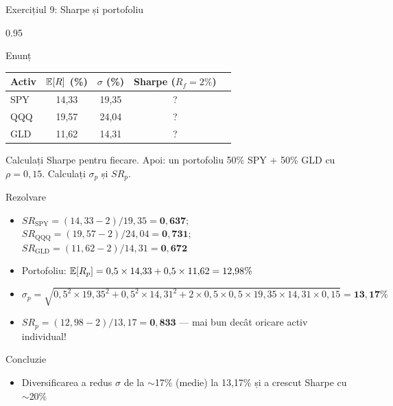 \documentclass[9pt, aspectratio=169, t]{beamer}
\begin{document}
\begin{frame}[shrink=15]{Exercițiul 9: Sharpe și portofoliu}
    \begin{cminipage}{0.95\textwidth}
    \begin{block}{Enunț}
    \begin{center}
    {\small\renewcommand{\arraystretch}{1.2}
    \begin{tabular}{lcccc}
    \toprule
    \textbf{Activ} & $\mathbb{E}[R]$ (\%) & $\sigma$ (\%) & \textbf{Sharpe} ($R_f = 2\%$) \\
    \midrule
    SPY & 14{,}33 & 19{,}35 & ? \\
    QQQ & 19{,}57 & 24{,}04 & ? \\
    GLD & 11{,}62 & 14{,}31 & ? \\
    \bottomrule
    \end{tabular}}
    \end{center}
    Calculați Sharpe pentru fiecare. Apoi: un portofoliu 50\% SPY + 50\% GLD cu $\rho = 0{,}15$. Calculați $\sigma_p$ și $SR_p$.
    \end{block}
    \vspace{0.1cm}
    \begin{exampleblock}{Rezolvare}
    \begin{itemize}\setlength{\itemsep}{0pt}
        \item $SR_{\text{SPY}} = (14{,}33 - 2)/19{,}35 = \mathbf{0{,}637}$; \; $SR_{\text{QQQ}} = (19{,}57 - 2)/24{,}04 = \mathbf{0{,}731}$; \; $SR_{\text{GLD}} = (11{,}62 - 2)/14{,}31 = \mathbf{0{,}672}$
        \item Portofoliu: $\mathbb{E}[R_p] = 0{,}5 \times 14{,}33 + 0{,}5 \times 11{,}62 = 12{,}98\%$
        \item $\sigma_p = \sqrt{0{,}5^2 \times 19{,}35^2 + 0{,}5^2 \times 14{,}31^2 + 2 \times 0{,}5 \times 0{,}5 \times 19{,}35 \times 14{,}31 \times 0{,}15} = \mathbf{13{,}17\%}$
        \item $SR_p = (12{,}98 - 2)/13{,}17 = \mathbf{0{,}833}$ --- mai bun decât oricare activ individual!
    \end{itemize}
    \end{exampleblock}
    \begin{alertblock}{Concluzie}
    \begin{itemize}\setlength{\itemsep}{0pt}
        \item Diversificarea a redus $\sigma$ de la $\sim$17\% (medie) la 13{,}17\% și a crescut Sharpe cu $\sim$20\%
    \end{itemize}
    \end{alertblock}
    \end{cminipage}
\end{frame}
\end{document}
